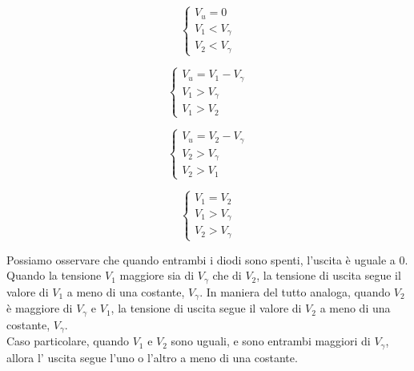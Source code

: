 \documentclass[../elettronica]{subfiles}
\begin{document}
\begin{minipage}[b]{.45\textwidth}
    \begin{tcolorbox}[title=D1 e D2 OFF]
        \[\begin{cases}
            V_u = 0
            \\
            V_{1} < V_\gamma
            \\
            V_{2} < V_\gamma
        \end{cases}\]
    \end{tcolorbox}
\end{minipage}
\begin{minipage}[b]{.45\textwidth}
    \begin{tcolorbox}[title=D1 ON e D2 OFF]
        \[\begin{cases}
            V_u = V_{1} - V_\gamma
            \\
            V_{1} > V_\gamma
            \\
            V_{1} > V_{2}
        \end{cases}\]
    \end{tcolorbox}
\end{minipage}

\begin{minipage}[b]{.45\textwidth}
    \begin{tcolorbox}[title=D1 OFF e D2 ON]
        \[\begin{cases}
            V_u = V_{2} - V_\gamma
            \\
            V_{2} > V_\gamma
            \\
            V_{2} > V_{1}
        \end{cases}\]
    \end{tcolorbox}
\end{minipage}
\begin{minipage}[b]{.45\textwidth}
    \begin{tcolorbox}[title=D1 ON e D2 ON]
        \[\begin{cases}
            V_{1} = V_{2}
            \\
            V_{1} > V_\gamma
            \\
            V_{2} > V_\gamma
        \end{cases}\]
    \end{tcolorbox}
\end{minipage}

\noindent Possiamo osservare che quando entrambi i diodi sono spenti, l'uscita è uguale a 0.
Quando la tensione $V_{1}$ maggiore sia di $V_\gamma$ che di $V_{2}$, la tensione di uscita segue il
valore di $V_{1}$ a meno di una costante, $V_\gamma$.
In maniera del tutto analoga, quando $V_{2}$ è maggiore di $V_\gamma$ e $V_{1}$, la tensione di uscita
segue il valore di $V_{2}$ a meno di una costante, $V_\gamma$.
\\
Caso  particolare, quando $V_1$ e $V_2$ sono uguali, e sono entrambi maggiori di $V_\gamma$, allora l'
uscita segue l'uno o l'altro a meno di una costante.
\end{document}
